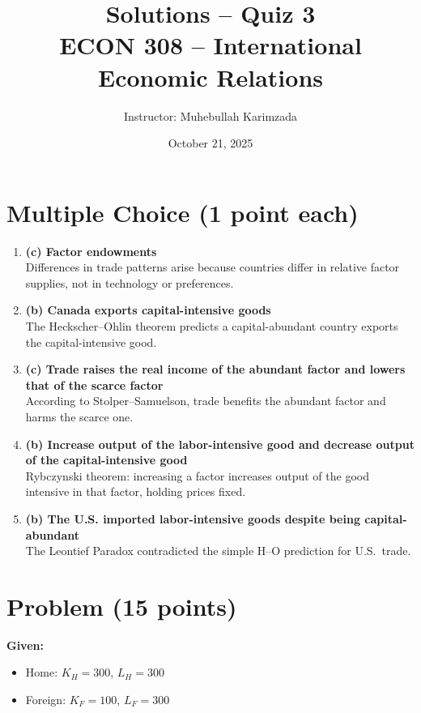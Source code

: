 \documentclass[12pt]{article}
\title{Solutions -- Quiz 3\\ \vspace{8pt} \Large ECON 308 -- International Economic Relations}
\author{Instructor: Muhebullah Karimzada}
\date{October 21,  2025}
\begin{document}
\maketitle

\section*{Multiple Choice (1 point each)}

\begin{enumerate}
    \item \textbf{(c) Factor endowments} \\
    Differences in trade patterns arise because countries differ in relative factor supplies, not in technology or preferences.

    \item \textbf{(b) Canada exports capital-intensive goods} \\
    The Heckscher--Ohlin theorem predicts a capital-abundant country exports the capital-intensive good.

    \item \textbf{(c) Trade raises the real income of the abundant factor and lowers that of the scarce factor} \\
    According to Stolper--Samuelson, trade benefits the abundant factor and harms the scarce one.

    \item \textbf{(b) Increase output of the labor-intensive good and decrease output of the capital-intensive good} \\
    Rybczynski theorem: increasing a factor increases output of the good intensive in that factor, holding prices fixed.

    \item \textbf{(b) The U.S. imported labor-intensive goods despite being capital-abundant} \\
    The Leontief Paradox contradicted the simple H--O prediction for U.S.\ trade.
\end{enumerate}

\newpage

\section*{Problem (15 points)}

\noindent \textbf{Given:}
\begin{itemize}
    \item Home: $K_H = 300$, $L_H = 300$
    \item Foreign: $K_F = 100$, $L_F = 300$
\end{itemize}
\end{document}
